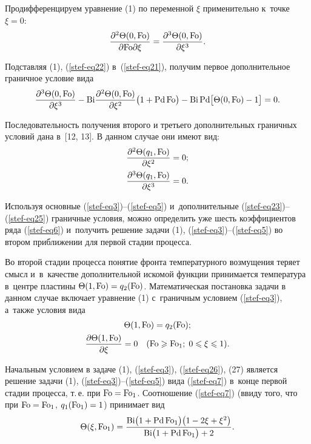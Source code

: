 Продифференцируем уравнение (1) по переменной $\xi $ применительно к~точке 
$\xi =0$:
\begin{equation}
\label{stef-eq22} 
\frac{\partial ^2\Theta ( 0,  {\rm Fo})}
{\partial {\rm Fo}\partial \xi }=
\frac{\partial ^3\Theta ( 0,  {\rm Fo})}{\partial \xi^3}.
\end{equation}

Подставляя (1), (\ref{stef-eq22}) в~(\ref{stef-eq21}), получим первое дополнительное граничное условие 
вида
\begin{equation}
\label{stef-eq23}
\frac{\partial ^3\Theta ( 0,  {\rm Fo})}{\partial \xi ^3}-
{\rm Bi}\frac{\partial ^2\Theta ( 0,  {\rm Fo})}{\partial \xi ^2}\bigl( {1+{\rm Pd}\,{\rm Fo}} \bigr)-
{\rm Bi}\,{\rm Pd}\bigl[ \Theta ( 0,  {\rm Fo})-1 \bigr]=0.
\end{equation}


Последовательность получения второго и третьего дополнительных граничных 
условий дана в~[12, 13]. В данном случае они имеют вид:
\begin{gather}
\label{stef-eq24}
\frac{\partial ^2\Theta (q_1, {\rm Fo})}{\partial \xi ^2}=0;
\\
\label{stef-eq25}
\frac{\partial^3\Theta (q_1, {\rm Fo})}{\partial \xi ^3}=0.
\end{gather}

Используя основные (\ref{stef-eq3})--(\ref{stef-eq5}) и~дополнительные (\ref{stef-eq23})--(\ref{stef-eq25}) граничные 
условия, можно определить уже шесть коэффициентов ряда (\ref{stef-eq6}) и~получить 
решение задачи (1), (\ref{stef-eq3})--(\ref{stef-eq5}) во втором приближении для первой стадии 
процесса.

Во второй стадии процесса понятие фронта температурного возмущения теряет 
смысл и~в~качестве дополнительной искомой функции принимается температура в~центре пластины 
$\Theta (1, {\rm Fo})=q_2 ({\rm Fo})$. 
Математическая постановка задачи в данном случае включает уравнение (1) с~граничным условием (\ref{stef-eq3}), а~также условия вида
\begin{gather}
\label{stef-eq26}
\Theta (1, {\rm Fo})=q_2 ({\rm Fo});
\\
\frac{\partial \Theta (1, {\rm Fo})}{\partial \xi }=0\quad 
({\rm Fo}\geqslant {\rm Fo}_1;\; 0\leqslant \xi \leqslant 1). 
\end{gather}


Начальным условием в задаче (1), (\ref{stef-eq3}), (\ref{stef-eq26}), (27) является решение задачи 
(1), (\ref{stef-eq3})--(\ref{stef-eq5}) вида (\ref{stef-eq7}) в~конце первой стадии процесса, т.\,е. при 
${\rm Fo}={\rm Fo}_1 $. Соотношение (\ref{stef-eq7}) (ввиду того, что при ${\rm Fo}={\rm Fo}_1 $, $q_1 ({\rm Fo}_1)=1$) принимает вид 
\begin{equation}
\label{stef-eq27}
\Theta (\xi ,  {\rm Fo}_1 )=\frac{{\rm Bi}\bigl( 1+{\rm Pd}\,{\rm Fo}_1 \bigr)\bigl( 1-2\xi +\xi ^2 \bigr)}
{{\rm Bi}\bigl( 1+{\rm Pd}\,{\rm Fo}_1 \bigr)+2}.
\end{equation}

